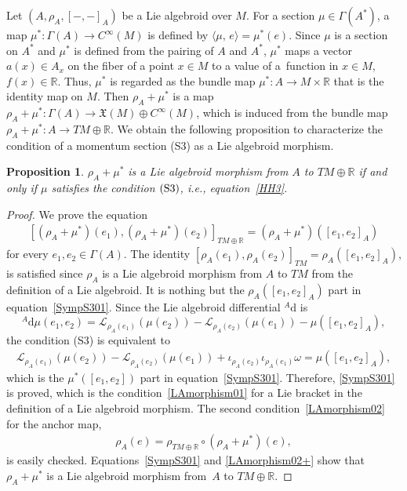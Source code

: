 \documentclass[10pt,a4paper]{amsart}
\numberwithin{equation}{section}
\newtheorem{Proposition}[Theorem]{Proposition}
 { \theoremstyle{definition}
\newtheorem{Definition}[Theorem]{Definition}
\newtheorem{Note}[Theorem]{Note}
\newtheorem{Example}[Theorem]{Example}
\newtheorem{Remark}[Theorem]{Remark}
\newtheorem{Question}[Theorem]{Question}
 }
\def\bR{{\mathbb{R}}}
\newcommand{\calL}{{\mathcal L}}
\newcommand{\liebra}[2]{{[{{#1},{#2}}]_{TM \oplus \bR}}}
\newcommand{\rhoa}{{\rho_A}}
\newcommand{\rhotr}{\rho_{TM \oplus \bR}}
\newcommand{\bracket}[2]{\langle #1,\,#2\rangle}
\newcommand{\rd}{\mathrm{d}}
\begin{document}
Let $(A, \rhoa, [-,-]_A)$ be a Lie algebroid over $M$.
For a section $\mu \in \Gamma(A^*)$,
a map $\mu^*\colon\Gamma(A) \rightarrow C^{\infty}(M)$
is defined by $\bracket{\mu}{e} = \mu^*(e)$.
Since $\mu$ is a section on $A^*$ and $\mu^*$ is defined from
the pairing of $A$ and $A^*$, $\mu^*$ maps a vector
$a(x) \in A_x$ on the fiber of a point $x \in M$ to a value of a~function
in $x \in M$, $f(x) \in \bR$.
Thus, $\mu^*$ is regarded as
the bundle map $\mu^*\colon A \rightarrow M \times \bR$ that
is the identity map on $M$.
Then $\rhoa + \mu^*$ is a map
$\rhoa + \mu^*\colon \Gamma(A) \rightarrow \mathfrak{X}(M) \oplus C^{\infty}(M)$,
which is induced from the bundle map
$\rhoa + \mu^*\colon A \rightarrow TM \oplus \bR$.
We obtain the following proposition to characterize the condition of a momentum section (S3) as a Lie algebroid morphism.
\begin{Proposition}\label{SympS3}
$\rhoa + \mu^*$ is a Lie algebroid morphism from $A$ to $TM \oplus \bR$
if and only if $\mu$
satisfies the condition $\rm (S3)$, i.e., equation~\eqref{HH3}.
\end{Proposition}

\begin{proof}
We prove the equation
\begin{gather}\label{SympS301}
\liebra{(\rhoa + \mu^*)(e_1)}{(\rhoa + \mu^*)(e_2)} =
(\rhoa + \mu^*)([e_1, e_2]_A)
\end{gather}
for every $e_1, e_2 \in \Gamma(A)$.
The identity
$[\rhoa(e_1), \rhoa(e_2)]_{TM} = \rhoa([e_1, e_2]_A)$,
is satisfied
since $\rhoa$ is a Lie algebroid morphism from $A$ to $TM$
from the definition of a Lie algebroid.
It is nothing but the $\rhoa([e_1, e_2]_A)$ part in equation~\eqref{SympS301}.
Since the Lie algebroid differential ${}^A \rd$ is
\[
{}^A \rd \mu (e_1, e_2)
=
\calL_{\rhoa(e_1)} (\mu(e_2)) - \calL_{\rhoa(e_2)} (\mu(e_1))
- \mu([e_1, e_2]_A),
\]
the condition (S3) is equivalent to
\begin{gather}
\calL_{\rhoa(e_1)} (\mu(e_2)) - \calL_{\rhoa(e_2)} (\mu(e_1))
+ \iota_{\rhoa(e_2)} \iota_{\rhoa(e_1)} \omega
= \mu([e_1, e_2]_A),
\label{LAmorphism01}
\end{gather}
which is the $\mu^*([e_1, e_2])$ part in equation~\eqref{SympS301}.
Therefore, \eqref{SympS301} is proved, which is the condition~\eqref{LAmorphism01} for a Lie bracket
in the definition of a Lie algebroid morphism.
The second condition~\eqref{LAmorphism02} for the anchor map,
\begin{gather}
\rhoa (e) =\rhotr \circ (\rhoa + \mu^*)(e),
\label{LAmorphism02+}
\end{gather}
is easily checked.
Equations~\eqref{SympS301} and \eqref{LAmorphism02+} show that $\rhoa+\mu^*$ is a Lie algebroid morphism from~$A$ to $TM \oplus \bR$.
\end{proof}
\end{document}
